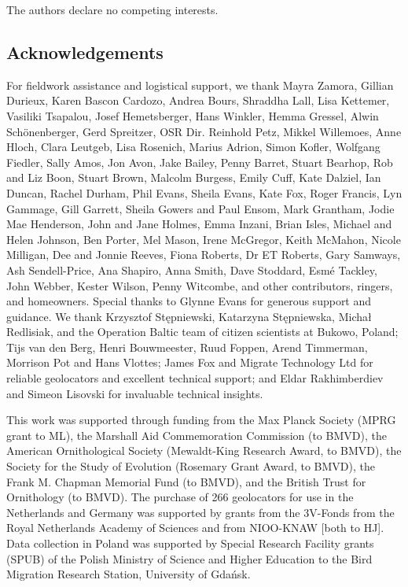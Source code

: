 \documentclass[a4paper, nobind]{templates/ociamthesis}
\begin{document}
The authors declare no competing interests.

\hypertarget{acknowledgements}{%
\subsection{Acknowledgements}\label{acknowledgements}}

For fieldwork assistance and logistical support, we thank Mayra Zamora, Gillian Durieux, Karen Bascon Cardozo, Andrea Bours, Shraddha Lall, Lisa Kettemer, Vasiliki Tsapalou, Josef Hemetsberger, Hans Winkler, Hemma Gressel, Alwin Schönenberger, Gerd Spreitzer, OSR Dir. Reinhold Petz, Mikkel Willemoes, Anne Hloch, Clara Leutgeb, Lisa Rosenich, Marius Adrion, Simon Kofler, Wolfgang Fiedler, Sally Amos, Jon Avon, Jake Bailey, Penny Barret, Stuart Bearhop, Rob and Liz Boon, Stuart Brown, Malcolm Burgess, Emily Cuff, Kate Dalziel, Ian Duncan, Rachel Durham, Phil Evans, Sheila Evans, Kate Fox, Roger Francis, Lyn Gammage, Gill Garrett, Sheila Gowers and Paul Ensom, Mark Grantham, Jodie Mae Henderson, John and Jane Holmes, Emma Inzani, Brian Isles, Michael and Helen Johnson, Ben Porter, Mel Mason, Irene McGregor, Keith McMahon, Nicole Milligan, Dee and Jonnie Reeves, Fiona Roberts, Dr ET Roberts, Gary Samways, Ash Sendell-Price, Ana Shapiro, Anna Smith, Dave Stoddard, Esmé Tackley, John Webber, Kester Wilson, Penny Witcombe, and other contributors, ringers, and homeowners. Special thanks to Glynne Evans for generous support and guidance. We thank Krzysztof Stępniewski, Katarzyna Stępniewska, Michał Redlisiak, and the Operation Baltic team of citizen scientists at Bukowo, Poland; Tijs van den Berg, Henri Bouwmeester, Ruud Foppen, Arend Timmerman, Morrison Pot and Hans Vlottes; James Fox and Migrate Technology Ltd for reliable geolocators and excellent technical support; and Eldar Rakhimberdiev and Simeon Lisovski for invaluable technical insights.

This work was supported through funding from the Max Planck Society (MPRG grant to ML), the Marshall Aid Commemoration Commission (to BMVD), the American Ornithological Society (Mewaldt-King Research Award, to BMVD), the Society for the Study of Evolution (Rosemary Grant Award, to BMVD), the Frank M. Chapman Memorial Fund (to BMVD), and the British Trust for Ornithology (to BMVD). The purchase of 266 geolocators for use in the Netherlands and Germany was supported by grants from the 3V-Fonds from the Royal Netherlands Academy of Sciences and from NIOO-KNAW {[}both to HJ{]}. Data collection in Poland was supported by Special Research Facility grants (SPUB) of the Polish Ministry of Science and Higher Education to the Bird Migration Research Station, University of Gdańsk.
\end{document}
